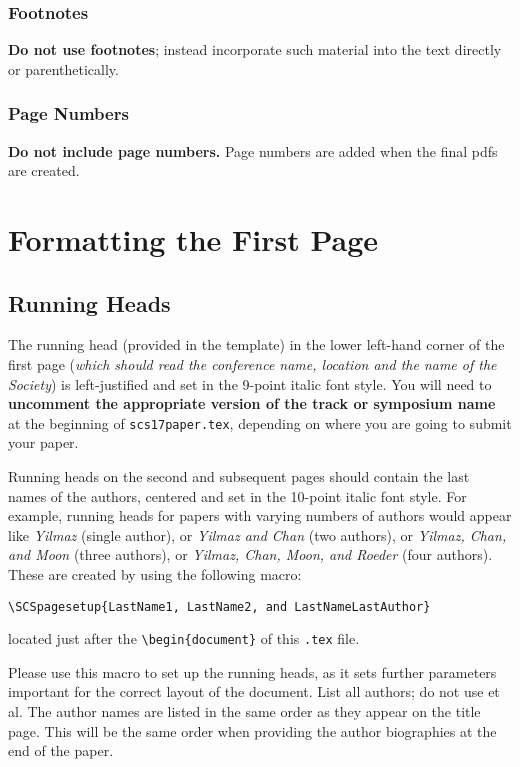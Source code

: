 \documentclass{scspaperproc}
\theoremstyle{scsthe}
\begin{document}
\subsubsection{Footnotes}
\textbf{Do not use footnotes}; instead incorporate such material into the text directly or parenthetically.

\subsubsection{Page Numbers}
\textbf{Do not include page numbers.} Page numbers are added when the final pdfs are created.


\section{Formatting the First Page}

\subsection{Running Heads}
The running head (provided in the template) in the lower left-hand corner of the first page (\textit{which should read the conference name, location and the name of the Society}) is left-justified and set in the 9-point italic font style. %
You will need to \textbf{uncomment the appropriate version of the track or symposium name} at the beginning of \texttt{scs17paper.tex}, depending on where you are going to submit your paper.

Running heads on the second and subsequent pages should contain the last names of the authors, centered and set in the 10-point italic font style. For example, running heads for papers with varying numbers of authors would appear like \emph{Yilmaz} (single author), or \emph{Yilmaz and Chan} (two authors), or \emph{Yilmaz, Chan, and Moon} (three authors), or \emph{Yilmaz, Chan, Moon, and Roeder} (four authors). These are created by using the following macro:

\noindent \begin{verbatim}
\SCSpagesetup{LastName1, LastName2, and LastNameLastAuthor}
\end{verbatim}

located just after the \verb+\begin{document}+ of this \texttt{.tex} file.

Please use this macro to set up the running heads, as it sets further parameters important for the correct layout of the document. List all authors; do not use et al. The author names are listed in the same order as they appear on the title page. This will be the same order when providing the author biographies at the end of the paper.
\end{document}
